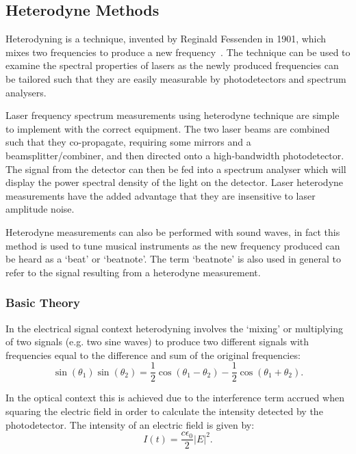 \subsection{Heterodyne Methods}

Heterodyning is a technique, invented by Reginald Fessenden in 1901, which mixes two frequencies to produce a new frequency~\cite{cooper_physics_2001}.
The technique can be used to examine the spectral properties of lasers as the newly produced frequencies can be tailored such that they are easily measurable by photodetectors and spectrum analysers.

Laser frequency spectrum measurements using heterodyne technique are simple to implement with the correct equipment.
The two laser beams are combined such that they co-propagate, requiring some mirrors and a beamsplitter/combiner, and then directed onto a high-bandwidth photodetector.
The signal from the detector can then be fed into a spectrum analyser which will display the power spectral density of the light on the detector.
Laser heterodyne measurements have the added advantage that they are insensitive to laser amplitude noise.

Heterodyne measurements can also be performed with sound waves, in fact this method is used to tune musical instruments as the new frequency produced can be heard as a `beat' or `beatnote'.
The term `beatnote' is also used in general to refer to the signal resulting from a heterodyne measurement.

\subsubsection{Basic Theory}
In the electrical signal context heterodyning involves the `mixing' or multiplying of two signals (e.g. two sine waves) to produce two different signals with frequencies equal to the difference and sum of the original frequencies:
\begin{equation}
\sin(\theta_1)\sin(\theta_2) = \frac{1}{2} \cos(\theta_1-\theta_2) - \frac{1}{2} \cos(\theta_1+\theta_2).
\end{equation}

In the optical context this is achieved due to the interference term accrued when squaring the electric field in order to calculate the intensity detected by the photodetector. The intensity of an electric field is given by:
\begin{equation}
I(t) = \frac{c\epsilon_0}{2}|E|^2.
\end{equation}

